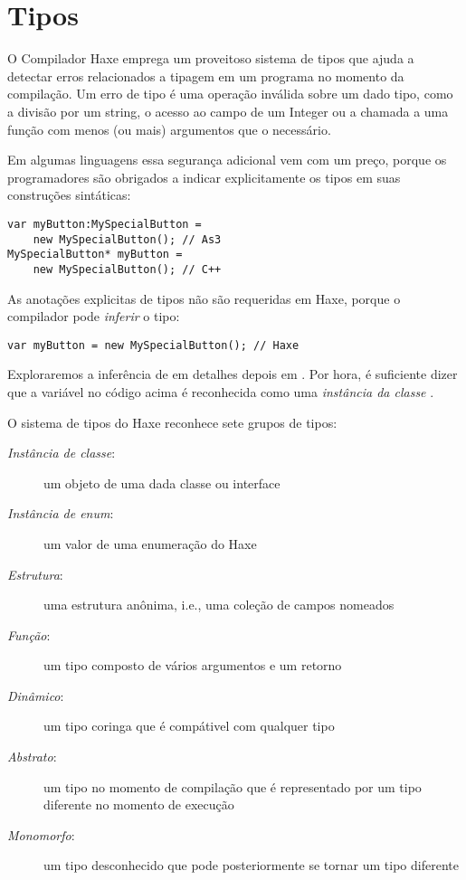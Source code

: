 \chapter{Tipos}
\label{types}

O Compilador Haxe emprega um proveitoso sistema de tipos que ajuda a detectar erros relacionados a tipagem em um programa no momento da compilação. Um erro de tipo é uma operação inválida sobre um dado tipo, como a divisão por um string, o acesso ao campo de um Integer ou a chamada a uma função com menos (ou mais) argumentos que o necessário.

Em algumas linguagens essa segurança adicional vem com um preço, porque os programadores são obrigados a indicar explicitamente os tipos em suas construções sintáticas:

\begin{lstlisting}
var myButton:MySpecialButton =
    new MySpecialButton(); // As3
MySpecialButton* myButton =
    new MySpecialButton(); // C++
\end{lstlisting}

As anotações explicitas de tipos não são requeridas em Haxe, porque o compilador pode \emph{inferir} o tipo:

\begin{lstlisting}
var myButton = new MySpecialButton(); // Haxe
\end{lstlisting}

Exploraremos a inferência de em detalhes depois em . Por hora, é suficiente dizer que a variável  no código acima é reconhecida como uma \emph{instância da classe} .

O sistema de tipos do Haxe reconhece sete grupos de tipos:

\begin{description}
 \item[\emph{Instância de classe}:] um objeto de uma dada classe ou interface
 \item[\emph{Instância de enum}:] um valor de uma enumeração do Haxe
 \item[\emph{Estrutura}:] uma estrutura anônima, i.e., uma coleção de campos nomeados
 \item[\emph{Função}:] um tipo composto de vários argumentos e um retorno
 \item[\emph{Dinâmico}:] um tipo coringa que é compátivel com qualquer tipo
 \item[\emph{Abstrato}:] um tipo no momento de compilação que é representado por um tipo diferente no momento de execução
 \item[\emph{Monomorfo}:] um tipo desconhecido que pode posteriormente se tornar um tipo diferente
\end{description}

